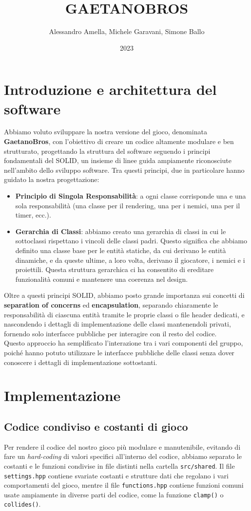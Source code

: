 \documentclass[a4paper,12pt]{article}
\title{\textbf{GAETANOBROS}}
\author{Alessandro Amella, Michele Garavani, Simone Ballo}
\date{2023}
\begin{document}
\maketitle

\section{Introduzione e architettura del software}
Abbiamo voluto sviluppare la nostra versione del gioco, denominata \textbf{GaetanoBros}, con l'obiettivo di creare un codice altamente modulare e ben strutturato, progettando la struttura del software seguendo i principi fondamentali del SOLID, un insieme di linee guida ampiamente riconosciute nell'ambito dello sviluppo software. Tra questi principi, due in particolare hanno guidato la nostra progettazione:
\begin{itemize}
\item \textbf{Principio di Singola Responsabilità}: a ogni classe corrisponde una e una sola responsabilità (una classe per il rendering, una per i nemici, una per il timer, ecc.).
\item \textbf{Gerarchia di Classi}: abbiamo creato una gerarchia di classi in cui le sottoclassi rispettano i vincoli delle classi padri. Questo significa che abbiamo definito una classe base per le entità statiche, da cui derivano le entità dinamiche, e da queste ultime, a loro volta, derivano il giocatore, i nemici e i proiettili. Questa struttura gerarchica ci ha consentito di ereditare funzionalità comuni e mantenere una coerenza nel design.
\end{itemize}

Oltre a questi principi SOLID, abbiamo posto grande importanza sui concetti di \textbf{separation of concerns} ed \textbf{encapsulation}, separando chiaramente le responsabilità di ciascuna entità tramite le proprie classi o file header dedicati, e nascondendo i dettagli di implementazione delle classi mantenendoli privati, fornendo solo interfacce pubbliche per interagire con il resto del codice.\\
Questo approccio ha semplificato l'interazione tra i vari componenti del gruppo, poiché hanno potuto utilizzare le interfacce pubbliche delle classi senza dover conoscere i dettagli di implementazione sottostanti.

\section{Implementazione}
\subsection{Codice condiviso e costanti di gioco}
Per rendere il codice del nostro gioco più modulare e manutenibile, evitando di fare un \textit{hard-coding} di valori specifici all'interno del codice, abbiamo separato le costanti e le funzioni condivise in file distinti nella cartella \texttt{src/shared}. Il file \texttt{settings.hpp} contiene svariate costanti e strutture dati che regolano i vari comportamenti del gioco, mentre il file \texttt{functions.hpp} contiene funzioni comuni usate ampiamente in diverse parti del codice, come la funzione \texttt{clamp()} o \texttt{collides()}.
\end{document}
